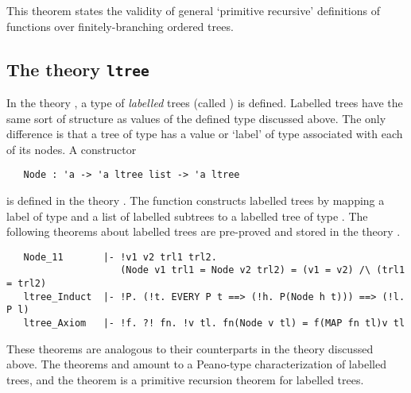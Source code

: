 \noindent This theorem states the validity of general `primitive recursive'
definitions of functions over finitely-branching ordered trees.

\subsection{The theory {\tt ltree}}

In the theory , a type of {\it
labelled\/} trees (called ) is defined. Labelled trees have the
same sort of structure as values of the defined type  discussed above.
The only difference is that a tree of type  has a value or `label'
of type  associated with each of its nodes.  A constructor

\begin{hol}
\begin{verbatim}
   Node : 'a -> 'a ltree list -> 'a ltree
\end{verbatim}\end{hol}

\noindent is defined in the theory .  The function 
constructs labelled trees by mapping a label of type  and a list of
labelled subtrees to a labelled tree of type .
The following theorems  about labelled trees are pre-proved and stored in the
theory .


\begin{hol}
\begin{verbatim}
   Node_11       |- !v1 v2 trl1 trl2.
                    (Node v1 trl1 = Node v2 trl2) = (v1 = v2) /\ (trl1 = trl2)
   ltree_Induct  |- !P. (!t. EVERY P t ==> (!h. P(Node h t))) ==> (!l. P l)
   ltree_Axiom   |- !f. ?! fn. !v tl. fn(Node v tl) = f(MAP fn tl)v tl
\end{verbatim}\end{hol}

\noindent These  theorems  are  analogous to  their counterparts  in the theory
 discussed  above.    The theorems  
and  amount to a Peano-type characterization of labelled
trees, and the theorem  is a primitive recursion theorem for
labelled trees.


